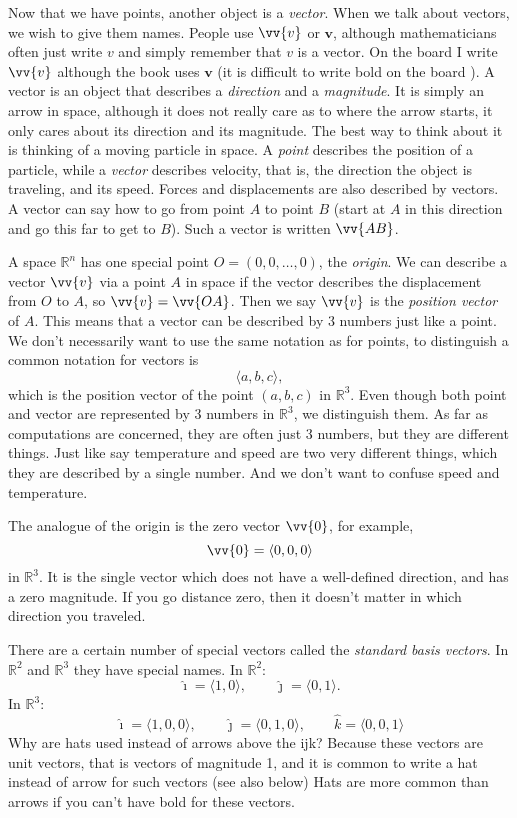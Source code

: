 \documentclass[11pt]{article}
\newcommand{\R}{{\mathbb{R}}}
\newcommand{\veci}{\hat{\imath}}
\newcommand{\vecj}{\hat{\jmath}}
\newcommand{\veck}{\hat{k}}
\begin{document}
Now that we have points, another object is a \emph{vector}.
When we talk about vectors, we wish to give them names.  People use
$\vv{v}$ or $\mathbf{v}$, although mathematicians often just write $v$ and simply remember
that $v$ is a vector.
On the board I write $\vv{v}$ although the book uses $\mathbf{v}$
(it is difficult to write bold on the board \Smiley{}).
A vector is an object that describes a \emph{direction} and a \emph{magnitude}.
It is simply an arrow in space,
although it does not really care as to where the arrow starts,
it only cares about its direction and its magnitude.
The best way to think about it is thinking of a moving particle in space.
A \emph{point} describes the position of a particle,
while a \emph{vector} describes velocity, that is, the direction the object is traveling, and its speed.
Forces and displacements are also described by vectors.
A vector can say how to go from point $A$ to point $B$
(start at $A$ in this direction and go this far to get to $B$).
Such a vector is written $\vv{AB}$.

A space $\R^n$ has one special point $O = (0,0,\ldots,0)$, the \emph{origin}.
We can describe a vector $\vv{v}$ via a point $A$ in space if the vector describes the
displacement from $O$ to $A$, so $\vv{v} = \vv{OA}$.
Then we say $\vv{v}$ is the \emph{position vector} of $A$.
This means that a vector can be described by 3 numbers just like a point.
We don't necessarily want to use the same notation as for points, to distinguish
a common notation for vectors is
$$
\langle a,b,c \rangle ,
$$
which is the position vector of the point $(a,b,c)$ in $\R^3$.
Even though both point and vector are represented by 3 numbers in $\R^3$,
we distinguish them.
As far as computations are concerned,
they are often just 3 numbers, but they are different things.
Just like say temperature and speed are two very different
things, which they are described by a single number.  And we don't want to
confuse speed and temperature.

The analogue of the origin is the zero vector $\vv{0}$, for example,
$$
\vv{0} = \langle 0,0,0 \rangle
$$
in $\R^3$.
It is the single vector which does not have a well-defined direction,
and has a zero magnitude.
If you go distance zero, then it doesn't matter in which direction
you traveled.

There are a certain number of special vectors called the
\emph{standard basis vectors}.
In $\R^2$ and $\R^3$ they have special names.
In $\R^2$:
$$
\veci = \langle 1 , 0 \rangle, \qquad
\vecj = \langle 0 , 1 \rangle.
$$
In $\R^3$:
$$
\veci = \langle 1, 0, 0 \rangle, \qquad
\vecj = \langle 0, 1, 0 \rangle, \qquad
\veck = \langle 0, 0, 1 \rangle
$$
Why are hats used instead of arrows above the ijk? Because these vectors are
unit vectors, that is vectors of magnitude 1, and it is common to write a hat instead of
arrow for such vectors (see also below)
Hats are more common than arrows if you can't have bold for these vectors.
\end{document}
